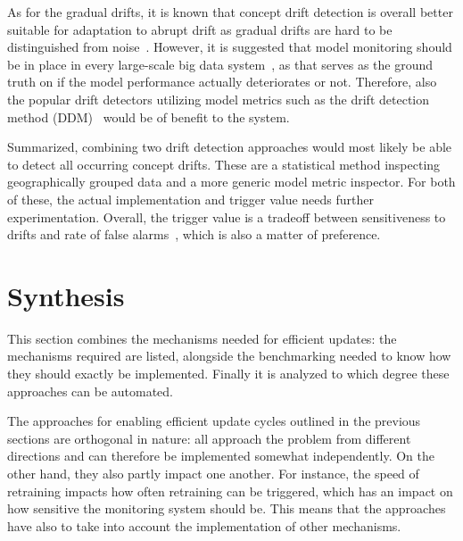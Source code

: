 As for the gradual drifts, it is known that concept drift detection is overall better suitable for adaptation to abrupt drift as gradual drifts are hard to be distinguished from noise~\cite{zliobaiteLearningConceptDrift2010}. However, it is suggested that model monitoring should be in place in every large-scale big data system~\cite{googlemlops}, as that serves as the ground truth on if the model performance actually deteriorates or not. Therefore, also the popular drift detectors utilizing model metrics such as the drift detection method (DDM)~\cite{gamaLearningDriftDetection2004} would be of benefit to the system.

Summarized, combining two drift detection approaches would most likely be able to detect all occurring concept drifts. These are a statistical method inspecting geographically grouped data and a more generic model metric inspector. For both of these, the actual implementation and trigger value needs further experimentation. Overall, the trigger value is a tradeoff between sensitiveness to drifts and rate of false alarms~\cite{faithfullUnsupervisedChangeDetection2018}, which is also a matter of preference.

\section{Synthesis}

This section combines the mechanisms needed for efficient updates: the mechanisms required are listed, alongside the benchmarking needed to know how they should exactly be implemented. Finally it is analyzed to which degree these approaches can be automated.


The approaches for enabling efficient update cycles outlined in the previous sections are orthogonal in nature: all approach the problem from different directions and can therefore be implemented somewhat independently. On the other hand, they also partly impact one another. For instance, the speed of retraining impacts how often retraining can be triggered, which has an impact on how sensitive the monitoring system should be. This means that the approaches have also to take into account the implementation of other mechanisms.

